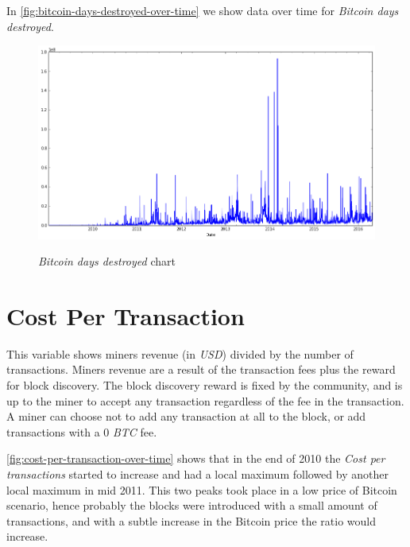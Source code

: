 In \autoref{fig:bitcoin-days-destroyed-over-time} we show data over
time for \textit{Bitcoin days destroyed}.

\begin{figure}[bth]
  \myfloatalign
  {\includegraphics[width=1\linewidth]
    {gfx/bitcoin-days-destroyed-over-time}}
  \caption{\textit{Bitcoin days destroyed} chart}
  \label{fig:bitcoin-days-destroyed-over-time}
\end{figure}



\section{Cost Per Transaction}
\label{sec:cost-per-transaction}

This variable shows miners revenue (in \textit{USD}) divided by the
number of transactions. Miners revenue are a result of the transaction
fees plus the reward for block discovery. The block discovery reward
is fixed by the community, and is up to the miner to accept any
transaction regardless of the fee in the transaction. A miner can
choose not to add any transaction at all to the block, or add
transactions with a $0$ \textit{BTC} fee.

\autoref{fig:cost-per-transaction-over-time} shows that in the end of
2010 the \textit{Cost per transactions} started to increase and had a
local maximum followed by another local maximum in mid 2011. This two
peaks took place in a low price of Bitcoin scenario, hence probably
the blocks were introduced with a small amount of transactions, and
with a subtle increase in the Bitcoin price the ratio would increase.

